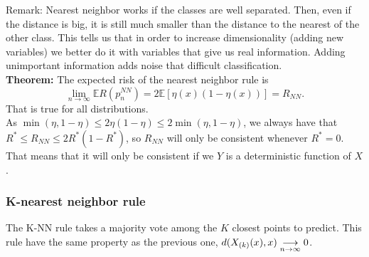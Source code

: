 \documentclass[11pt, english]{article}
\begin{document}
Remark: Nearest neighbor works if the classes are well separated. Then, even if the distance is big, it is still much smaller than the distance to the nearest of the other class. This tells us that in order to increase dimensionality (adding new variables) we better do it with variables that give us real information. Adding unimportant information adds noise that difficult classification.\\

\textbf{Theorem:} The expected risk of the nearest neighbor rule is 
\begin{equation}
	\underset{n\rightarrow \infty}{\lim}\mathbb{E}R(p_n^{NN})=2\mathbb{E}[\eta(x)(1-\eta(x))]=R_{NN}.
\end{equation}
That is true for all distributions.\\

As $\min(\eta,1-\eta)\leq2\eta(1-\eta)\leq 2\min(\eta,1-\eta)$, we always have that $R^*\leq R_{NN}\leq 2R^*(1-R^*)$, so $R_{NN}$ will only be consistent whenever $R^*=0$. That means that it will only be consistent if we $Y$ is a deterministic function of $X$.\\

\subsubsection{K-nearest neighbor rule}

The K-NN rule takes a majority vote among the $K$ closest points to predict. This rule have the same property as the previous one, $d(X_{(k)}(x),x)\underset{\scriptsize{n\rightarrow \infty}}{\longrightarrow}0$. \\
\end{document}
